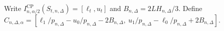 Write \(I^{\mathrm{CP}}_{n,\alpha/2}(S_{t,n,\Delta})=[\ell_t,u_t]\) and \(B_{n,\Delta}=2L H_{n,\Delta}/3\). Define \(C_{n,\Delta,\alpha}=[\ell_1/p_{n,\Delta}-u_0/p_{n,\Delta}-2B_{n,\Delta},\ u_1/p_{n,\Delta}-\ell_0/p_{n,\Delta}+2B_{n,\Delta}]\).